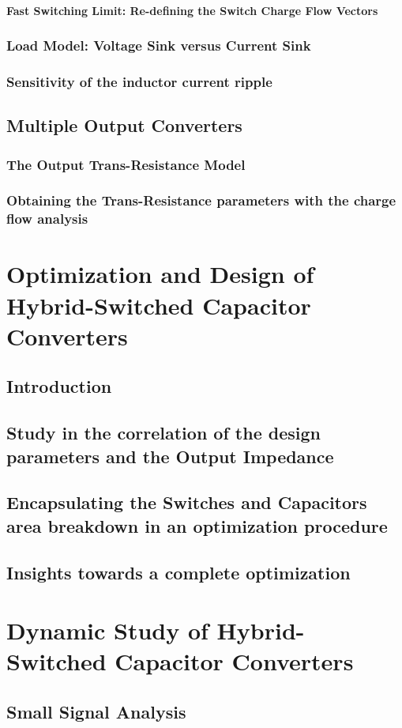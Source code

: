 \subsubsection[FSL Switch Charge Flow]{Fast Switching Limit: Re-defining the Switch Charge Flow Vectors}

\subsection{Load Model: Voltage Sink versus Current Sink}
\subsection{Sensitivity of the inductor current ripple}

\section{Multiple Output Converters}
\subsection{The Output Trans-Resistance Model}
\subsection{Obtaining the Trans-Resistance parameters with the charge flow analysis }



\chapter[Optimization and Design]{Optimization and Design of Hybrid-Switched Capacitor Converters}
\section{Introduction}
\section{Study in the correlation of the design parameters and the Output Impedance}
\section{Encapsulating the Switches and Capacitors area breakdown in an optimization procedure}
\section{Insights towards a complete optimization}

\chapter[Dynamic Study]{Dynamic Study of Hybrid-Switched Capacitor Converters}
\section{Small Signal Analysis}


\clearpage

 